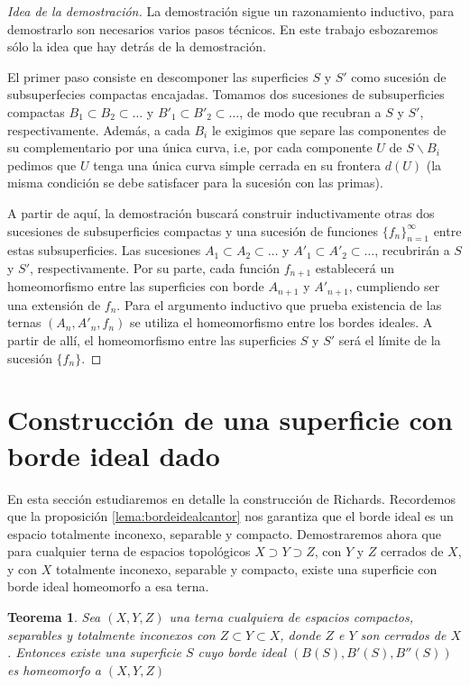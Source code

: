 \documentclass[a4paper,11pt,spanish, twoside, leqno]{tfg-uam}
\newtheorem{teor}{Teorema}[chapter]
\theoremstyle{definition}
\begin{document}
\begin{proof}[Idea de la demostración]
La demostración sigue un razonamiento inductivo, para demostrarlo son necesarios varios pasos técnicos. En este trabajo esbozaremos sólo la idea que hay detrás de la demostración.

El primer paso consiste en descomponer las superficies $S$ y $S'$ como sucesión de subsuperfecies compactas encajadas. Tomamos dos sucesiones de subsuperficies compactas $B_1 \subset B_2 \subset \ldots$ y $B'_1 \subset B'_2 \subset \ldots$, de modo que recubran a $S$ y $S'$, respectivamente. Además, a cada $B_i$ le exigimos  que separe las componentes de su complementario por una única curva, i.e, por cada componente $U$ de $S\backslash B_i$  pedimos que $U$  tenga una única curva simple cerrada en su frontera $d(U)$ (la misma condición se debe satisfacer para la sucesión con las primas).

A partir de aquí, la demostración buscará construir inductivamente otras dos sucesiones de subsuperficies compactas y una sucesión de funciones $\{f_n\}_{n=1}^{\infty}$ entre estas subsuperficies. Las sucesiones $A_1 \subset A_2 \subset \ldots$ y $A'_1 \subset A'_2 \subset \ldots$, recubrirán a $S$ y $S'$, respectivamente. Por su parte, cada función $f_{n+1}$ establecerá un homeomorfismo entre las superficies con borde   $A_{n+1}$ y $A'_{n+1}$, cumpliendo ser una extensión de $f_n$. Para el argumento inductivo que prueba existencia de las ternas $(A_n, A'_n, f_n)$ se utiliza el homeomorfismo entre los bordes ideales. A partir de allí, el homeomorfismo entre las superficies $S$ y $S'$ será el límite de la sucesión $\{f_n\}$.

\end{proof}


\section{Construcción de una superficie con borde ideal dado}
En esta sección estudiaremos en detalle la construcción de Richards. Recordemos que la proposición \ref{lema:bordeidealcantor} nos garantiza que el borde ideal es un espacio totalmente inconexo, separable y compacto. Demostraremos ahora que para cualquier terna de espacios topológicos $X \supset Y \supset Z$, con $Y$ y $Z$ cerrados de $X$, y con $X$ totalmente inconexo, separable y compacto, existe una superficie con borde ideal homeomorfo a esa terna.\\

\begin{teor}
\label{teor:richards}
Sea $(X,Y,Z)$ una terna cualquiera de espacios compactos, separables y totalmente inconexos con $Z \subset Y \subset X$, donde $Z$ e $Y$ son cerrados de $X$.  Entonces existe una superficie $S$ cuyo borde ideal $(B(S), B'(S), B''(S))$  es homeomorfo a $(X,Y,Z)$
\end{teor}
\end{document}
